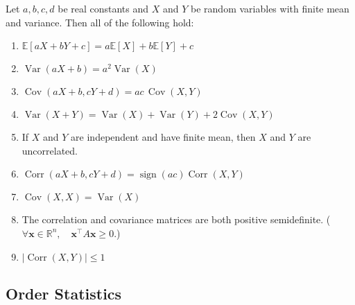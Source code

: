 \documentclass{article}
\begin{document}
\begin{tcolorbox}[colback=white,colframe=black,title={Properties of Expectation, Variance, and Covariance}]
Let $a,b,c,d$ be real constants and $X$ and $Y$ be random variables with finite mean and variance. Then all of the following hold:
\begin{enumerate}
    \item $\mathbb{E}[aX + bY + c] = a\mathbb{E}[X] + b\mathbb{E}[Y] + c$
    \item $\operatorname{Var}(aX + b) = a^2 \operatorname{Var}(X)$
    \item $\operatorname{Cov}(aX + b, cY + d) = ac \, \operatorname{Cov}(X,Y)$
    \item $\operatorname{Var}(X + Y) = \operatorname{Var}(X) + \operatorname{Var}(Y) + 2\operatorname{Cov}(X,Y)$
    \item If $X$ and $Y$ are independent and have finite mean, then $X$ and $Y$ are uncorrelated.
    \item $\operatorname{Corr}(aX + b, cY + d) = \operatorname{sign}(ac) \operatorname{Corr}(X,Y)$
    \item $\operatorname{Cov}(X,X) = \operatorname{Var}(X)$
    \item The correlation and covariance matrices are both positive semidefinite. ($
\forall \mathbf{x} \in \mathbb{R}^n,\quad \mathbf{x}^\top A \mathbf{x} \geq 0.
$)
    \item $\lvert \operatorname{Corr}(X,Y) \rvert \le 1$
\end{enumerate}
\end{tcolorbox}

\subsection{Order Statistics}

\newpage

    
\end{document}
